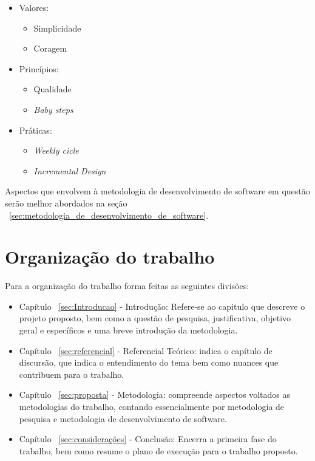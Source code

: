 \begin{itemize}
   \item Valores:
   \begin{itemize}
       \item Simplicidade
       \item Coragem
    \end{itemize}
    \item Princípios:
    \begin{itemize}
       \item Qualidade
       \item \textit{Baby steps}
    \end{itemize}
    \item Práticas:
    \begin{itemize}
       \item \textit{Weekly cicle}
       \item \textit{Incremental Design}
    \end{itemize}
\end{itemize}

 
Aspectos que envolvem à metodologia de desenvolvimento de software em questão serão melhor abordados na seção ~\ref{sec:metodologia_de_desenvolvimento_de_software}.

\section{Organização do trabalho}

Para a organização do trabalho forma feitas as seguintes divisões:

\begin{itemize}
   \item Capítulo ~\ref{sec:Introducao} - Introdução: Refere-se ao capitulo que descreve o projeto proposto, bem como a questão de pesquisa, justificativa, objetivo geral e específicos e uma breve introdução da metodologia.
   \item Capítulo ~\ref{sec:referencial} - Referencial Teórico: indica o capítulo de  discursão, que indica o entendimento do tema bem como nuances que contribuem para o trabalho.
   \item Capítulo ~\ref{sec:proposta} - Metodologia: compreende aspectos voltados as metodologias do trabalho, contando essencialmente por metodologia de pesquisa e metodologia de desenvolvimento de software.
   \item Capítulo ~\ref{sec:considerações} - Conclusão: Encerra a primeira fase do trabalho, bem como resume o plano de execução para o trabalho proposto.
\end{itemize}